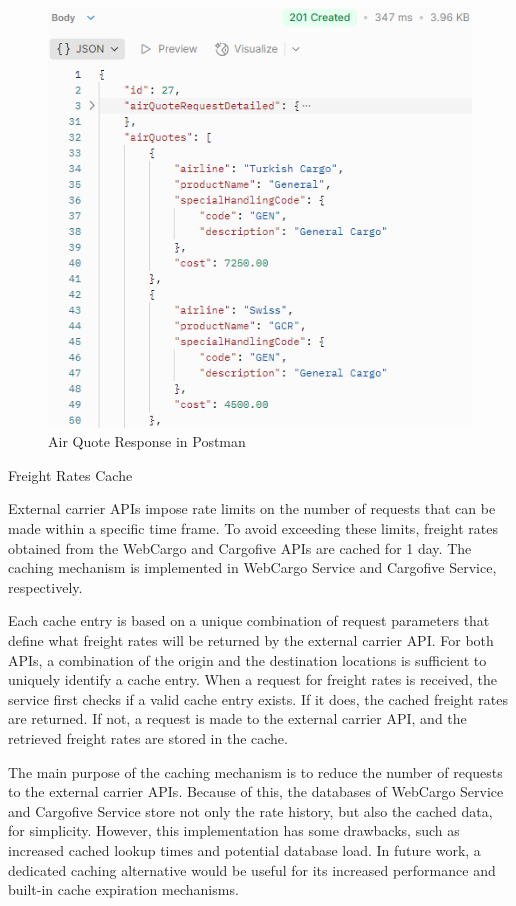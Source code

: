 \documentclass[12pt, reqno, oneside]{amsbook}
\makeatletter
\def\subsection{\@startsection{subsection}{2}%
      \z@{.5\linespacing\@plus.7\linespacing}{.25\linespacing}%
      {\normalfont\bfseries\flushleft}}
\theoremstyle{definition}
\theoremstyle{definition}
\numberwithin{section}{chapter}
\numberwithin{table}{chapter}
\numberwithin{figure}{chapter}
\makeatother
\begin{document}
\begin{figure}[H]
  \centering
  \includegraphics[width=0.8\linewidth]{images/AirQuoteResponsePostman.png}
  \caption{\label{Figure:AirQuoteResponsePostman}Air Quote Response in Postman}
\end{figure}

\pagebreak

\subsection{Freight Rates Cache}
\label{Subsection:Freight_Rates_Cache}

External carrier \acp{API} impose rate limits on the number of requests that can be made within a specific time frame. To avoid exceeding these limits, freight rates obtained from the WebCargo and Cargofive \Acp{API} are cached for 1 day. The caching mechanism is implemented in WebCargo Service and Cargofive Service, respectively.

Each cache entry is based on a unique combination of request parameters that define what freight rates will be returned by the external carrier \ac{API}. For both \acp{API}, a combination of the origin and the destination locations is sufficient to uniquely identify a cache entry. When a request for freight rates is received, the service first checks if a valid cache entry exists. If it does, the cached freight rates are returned. If not, a request is made to the external carrier \ac{API}, and the retrieved freight rates are stored in the cache.

The main purpose of the caching mechanism is to reduce the number of requests to the external carrier \acp{API}. Because of this, the databases of WebCargo Service and Cargofive Service store not only the rate history, but also the cached data, for simplicity. However, this implementation has some drawbacks, such as increased cached lookup times and potential database load. In future work, a dedicated caching alternative would be useful for its increased performance and built-in cache expiration mechanisms.
\end{document}
